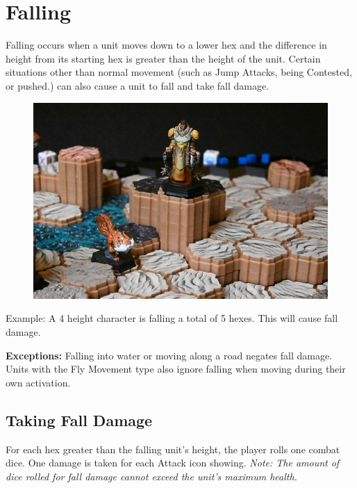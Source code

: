 \documentclass[../main.tex]{subfiles}
\begin{document}
\section{Falling}
Falling occurs when a unit moves down to a lower hex and the difference in height from its starting hex is greater than the height of the unit. Certain situations other than normal movement (such as Jump Attacks, being Contested, or pushed.) can also cause a unit to fall and take fall damage. 

\begin{figure}[h]
    \centering
    \includegraphics[width=0.85\linewidth]{chapters//Movement/TimeStrikeFallDamage.jpg}
\end{figure}

Example: A 4 height character is falling a total of 5 hexes. This will cause fall damage. 

\textbf{Exceptions:} Falling into water or moving along a road negates fall damage. Units with the Fly Movement type also ignore falling when moving during their own activation. 

\subsection{Taking Fall Damage}
For each hex greater than the falling unit's height, the player rolls one combat dice. One damage is taken for each Attack icon showing. \textit{Note: The amount of dice rolled for fall damage cannot exceed the unit's maximum health.}
\end{document}

